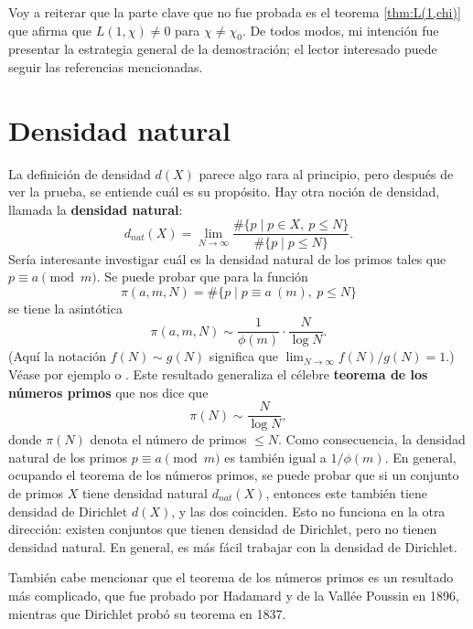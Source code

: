 \vspace{1em}

Voy a reiterar que la parte clave que no fue probada es el teorema
\ref{thm:L(1,chi)} que afirma que $L (1,\chi) \ne 0$ para $\chi \ne \chi_0$.
De todos modos, mi intención fue presentar la estrategia general de
la demostración; el lector interesado puede seguir las referencias mencionadas.


\section{Densidad natural}

La definición de densidad $d (X)$ parece algo rara al principio, pero después
de ver la prueba, se entiende cuál es su propósito. Hay otra noción de densidad,
llamada la \textbf{densidad natural}:
$$d_{nat} (X) = \lim_{N\to\infty} \frac{\# \{ p \mid p\in X, ~ p \le N \}}{\# \{ p \mid p \le N \}}.$$
Sería interesante investigar cuál es la densidad natural de los primos tales que
$p \equiv a \pmod{m}$. Se puede probar que para la función
$$\pi (a,m,N) = \# \{ p \mid p \equiv a ~ (m), ~ p \le N \}$$
se tiene la asintótica
$$\pi (a,m,N) \sim \frac{1}{\phi (m)}\cdot \frac{N}{\log N}.$$
(Aquí la notación $f (N) \sim g (N)$ significa que
$\lim_{N\to\infty} f(N)/g(N) = 1$.) Véase por ejemplo
\cite[Chapter~7]{Everiste-ANT} o
\cite[Chapter~6]{Hlawka-Taschner-Schoissengeier}.
Este resultado generaliza el célebre \textbf{teorema de los números primos}
que nos dice que
$$\pi (N) \sim \frac{N}{\log N},$$
donde $\pi (N)$ denota el número de primos $\le N$. Como consecuencia,
la densidad natural de los primos $p \equiv a \pmod{m}$ es también igual a
$1/\phi(m)$. En general, ocupando el teorema de los números primos, se puede
probar que si un conjunto de primos $X$ tiene densidad natural $d_{nat} (X)$,
entonces este también tiene densidad de Dirichlet $d (X)$, y las dos coinciden.
Esto no funciona en la otra dirección: existen conjuntos que tienen densidad
de Dirichlet, pero no tienen densidad natural. En general, es más fácil trabajar
con la densidad de Dirichlet.

También cabe mencionar que el teorema de los números primos es un resultado más
complicado, que fue probado por Hadamard y de la Vallée Poussin en 1896,
mientras que Dirichlet probó su teorema en 1837.


